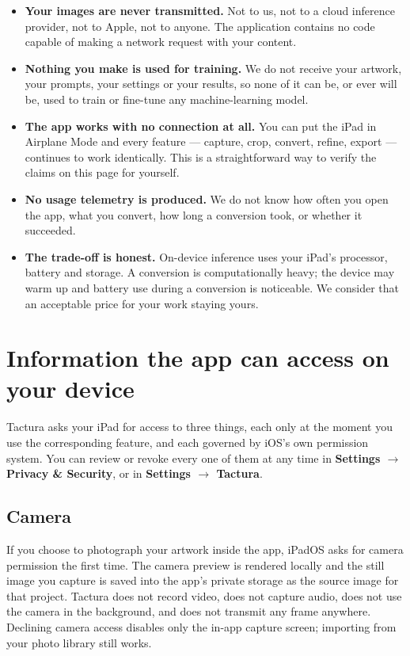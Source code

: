 \documentclass[11pt]{article}
\begin{document}
\begin{itemize}
  \item \textbf{Your images are never transmitted.} Not to us, not to a cloud
        inference provider, not to Apple, not to anyone. The application contains no
        code capable of making a network request with your content.
  \item \textbf{Nothing you make is used for training.} We do not receive your
        artwork, your prompts, your settings or your results, so none of it can be, or
        ever will be, used to train or fine-tune any machine-learning model.
  \item \textbf{The app works with no connection at all.} You can put the iPad in
        Airplane Mode and every feature — capture, crop, convert, refine, export —
        continues to work identically. This is a straightforward way to verify the
        claims on this page for yourself.
  \item \textbf{No usage telemetry is produced.} We do not know how often you open the
        app, what you convert, how long a conversion took, or whether it succeeded.
  \item \textbf{The trade-off is honest.} On-device inference uses your iPad's
        processor, battery and storage. A conversion is computationally heavy; the
        device may warm up and battery use during a conversion is noticeable. We
        consider that an acceptable price for your work staying yours.
\end{itemize}

\section{Information the app can access on your device}

Tactura asks your iPad for access to three things, each only at the moment you use the
corresponding feature, and each governed by iOS's own permission system. You can
review or revoke every one of them at any time in \textbf{Settings $\rightarrow$
Privacy \& Security}, or in \textbf{Settings $\rightarrow$ Tactura}.

\subsection{Camera}
If you choose to photograph your artwork inside the app, iPadOS asks for camera
permission the first time. The camera preview is rendered locally and the still image
you capture is saved into the app's private storage as the source image for that
project. Tactura does not record video, does not capture audio, does not use the
camera in the background, and does not transmit any frame anywhere. Declining camera
access disables only the in-app capture screen; importing from your photo library
still works.
\end{document}
